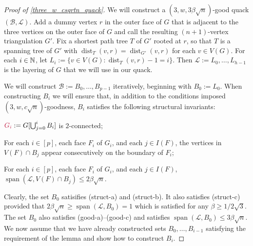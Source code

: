 \documentclass{patmorin}
\makeatletter
\def\mathcolor#1#{\@mathcolor{#1}}
\def\@mathcolor#1#2#3{%
  \protect\leavevmode
  \begingroup
    \color#1{#2}#3%
  \endgroup
}
\newcommand{\mathdefin}[1]{\mathcolor{brightmaroon}{#1}}
\DeclareMathOperator{\spn}{span}
\DeclareMathOperator{\dist}{dist}
\makeatother
\begin{document}



\begin{proof}[Proof of \cref{three_w_csqrtn_quack}]
  We will construct a  $(3,w,3\beta\sqrt{n})$-good quack $(\mathcal{B},\mathcal{L})$.
  Add a dummy vertex $r$ in the outer face of $G$ that is adjacent to the three vertices on the outer face of $G$ and call the resulting $(n+1)$-vertex triangulation $G'$.  Fix a shortest path tree $T$ of $G'$ rooted at $r$, so that $T$ is a spanning tree of $G'$ with $\dist_T(v,r)=\dist_{G'}(v,r)$ for each $v\in V(G)$.  For each $i\in\mathbb{N}$, let $L_i:=\{v\in V(G):\dist_T(v,r)-1=i\}$.  Then $\mathcal{L}:=L_0,\ldots,L_{h-1}$ is the layering of $G$ that we will use in our quack.

  We will construct $\mathcal{B}:=B_0,\ldots,B_{p-1}$ iteratively, beginning with $B_0:=L_0$.  When constructing $B_i$ we will ensure that, in addition to the conditions imposed $(3,w,c\sqrt{n})$-goodness, $B_i$ satisfies the following structural invariants:
  \begin{compactenum}[({struct}-a)]
    \item $\mathdefin{G_i}:=G[\bigcup_{j=0}^i B_i]$ is $2$-connected;
    \item For each $i\in[p]$, each face $F_i$ of $G_i$, and each $j\in I(F)$,  the vertices in $V(F)\cap B_j$ appear consecutively on the boundary of $F_i$;
    \item For each $i\in[p]$, each face $F_i$ of $G_i$, and each $j\in I(F)$, $\spn(\mathcal{L},V(F)\cap B_j)\le 2\beta\sqrt{n}$.
  \end{compactenum}

  Clearly, the set $B_0$ satisifies (struct-a) and (struct-b). It also satisfies (struct-c) provided that $2\beta\sqrt{n} \ge \spn(\mathcal{L},B_0)=1$ which is satisfied for any $\beta\ge 1/2\sqrt{3}$.  The set $B_0$ also satisfies (good-a)--(good-c) and satisfies $\spn(\mathcal{L},B_0)\le 3\beta\sqrt{n}$.  We now assume that we have already constructed sets $B_0,\ldots,B_{i-1}$ satisfying the requirement of the lemma and show how to construct $B_i$.


\end{proof}
\end{document}
